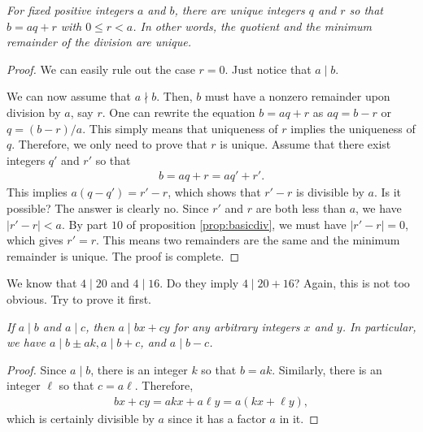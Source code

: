 \documentclass{subfile}
\begin{document}
	\begin{proposition}\slshape
		For fixed positive integers $a$ and $b$, there are unique integers $q$ and $r$ so that $b=aq+r$ with $0\leq r<a$. In other words, the quotient and the minimum remainder of the division are unique.
	\end{proposition}

	\begin{proof}
		We can easily rule out the case $r=0$. Just notice that $a\mid b$.

		We can now assume that $a\nmid b$. Then, $b$ must have a nonzero remainder upon division by $a$, say $r$. One can rewrite the equation $b=aq+r$ as $aq=b-r$ or $q=(b-r)/a$. This simply means that uniqueness of $r$ implies the uniqueness of $q$. Therefore, we only need to prove that $r$ is unique. Assume that there exist integers $q'$ and $r'$ so that
		\begin{align*}
			b=aq+r=aq'+r'.
		\end{align*}
		This implies $a(q-q')=r'-r$, which shows that $r'-r$ is divisible by $a$. Is it possible? The answer is clearly no. Since $r'$ and $r$ are both less than $a$, we have $|r'-r|<a$. By part $10$ of proposition \eqref{prop:basicdiv}, we must have $|r'-r|=0$, which gives $r'=r$. This means two remainders are the same and the minimum remainder is unique. The proof is complete.
	\end{proof}


	\begin{question}
		We know that $4\mid 20$ and $4\mid 16$. Do they imply $4\mid 20+16$? Again, this is not too obvious. Try to prove it first.
	\end{question}

	\begin{proposition}\slshape\label{prop:a|bx+cy}
		If $a\mid b$ and $a\mid c$, then $a\mid bx+cy$ for any arbitrary integers $x$ and $y$. In particular, we have $a\mid b\pm ak,a\mid b+c$, and $a\mid b-c$.
	\end{proposition}

	\begin{proof}
		Since $a\mid b$, there is an integer $k$ so that $b=ak$. Similarly, there is an integer $\ell$ so that $c=a\ell$. Therefore,
		\begin{align*}
			bx+cy=akx+a\ell y=a(kx+\ell y),
		\end{align*}
		which is certainly divisible by $a$ since it has a factor $a$ in it.
	\end{proof}
\end{document}
